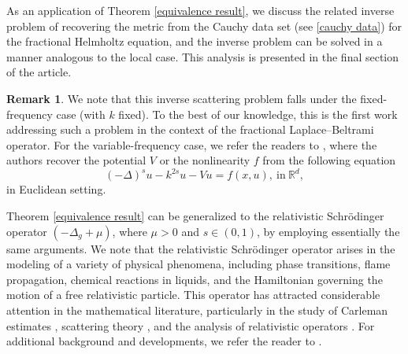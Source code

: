 \documentclass[12pt]{amsart}
\numberwithin{equation}{section}
\theoremstyle{definition}
\newtheorem{rem}[thm]{Remark}
\theoremstyle{remark}
\numberwithin{equation}{section}
\begin{document}
	As an application of Theorem \ref{equivalence result}, we discuss the related inverse problem of recovering the metric from the Cauchy data set (see \eqref{cauchy data}) for the fractional Helmholtz equation, and the inverse problem can be solved in a manner analogous to the local case. This analysis is presented in the final section of the article.
	\begin{rem}
		We note that this inverse scattering problem falls under the fixed-frequency case (with $k$ fixed). To the best of our knowledge, this is the first work addressing such a problem in the context of the fractional Laplace--Beltrami operator. For the variable-frequency case, we refer the readers to \cite{das2025inverse, das2026nonlocalnonlinearinversescattering}, where the authors recover the potential $V$ or the nonlinearity $f$ from the following equation
		\[
		(-\Delta)^s u-k^{2s}u -Vu=f(x,u), \ \text{in}\ \mathbb{R}^d,
		\]
		in Euclidean setting. 
	\end{rem}
	Theorem \ref{equivalence result} can be generalized to the relativistic Schr\"odinger operator $(-\Delta_g+\mu)$, where $\mu>0$ and $s\in(0,1)$, by employing essentially the same arguments. We note that the relativistic Schr\"odinger operator arises in the modeling of a variety of physical phenomena, including phase transitions, flame propagation, chemical reactions in liquids, and the Hamiltonian governing the motion of a free relativistic particle. This operator has attracted considerable attention in the mathematical literature, particularly in the study of Carleman estimates \cite{roncal2023carleman}, scattering theory \cite{ishida2020propagation}, and the analysis of relativistic operators \cite{lammerzahl1993pseudodifferential, ambrosio2022fractional, ambrosio2022note}. For additional background and developments, we refer the reader to \cite{byczkowski2009bessel, carmona1990relativistic, grzywny2008two}.
	
\end{document}
